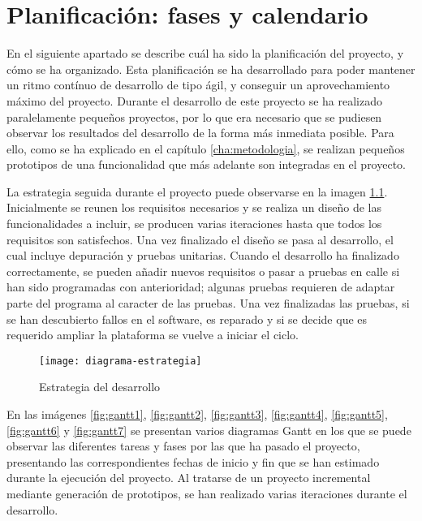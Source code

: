 \chapter{Planificación: fases y calendario}
En el siguiente apartado se describe cuál ha sido la planificación del proyecto, y cómo se ha organizado. Esta planificación se ha desarrollado para poder mantener un ritmo contínuo de desarrollo de tipo ágil, y conseguir un aprovechamiento máximo del proyecto. Durante el desarrollo de este proyecto se ha realizado paralelamente pequeños proyectos, por lo que era necesario que se pudiesen observar los resultados del desarrollo de la forma más inmediata posible. Para ello, como se ha explicado en el capítulo \ref{cha:metodologia}, se realizan pequeños prototipos de una funcionalidad que más adelante son integradas en el proyecto.

La estrategia seguida durante el proyecto puede observarse en la imagen \ref{fig:estrategia}. Inicialmente se reunen los requisitos necesarios y se realiza un diseño de las funcionalidades a incluir, se producen varias iteraciones hasta que todos los requisitos son satisfechos. Una vez finalizado el diseño se pasa al desarrollo, el cual incluye depuración y pruebas unitarias. Cuando el desarrollo ha finalizado correctamente, se pueden añadir nuevos requisitos o pasar a pruebas en calle si han sido programadas con anterioridad; algunas pruebas requieren de adaptar parte del programa al caracter de las pruebas. Una vez finalizadas las pruebas, si se han descubierto fallos en el software, es reparado y si se decide que es requerido ampliar la plataforma se vuelve a iniciar el ciclo.
\begin{figure}[H]
	\begin{center}
		\texttt{[image: diagrama-estrategia]}
		\caption{Estrategia del desarrollo}
		\label{fig:estrategia}
	\end{center}
\end{figure}

En las imágenes \ref{fig:gantt1}, \ref{fig:gantt2}, \ref{fig:gantt3}, \ref{fig:gantt4}, \ref{fig:gantt5}, \ref{fig:gantt6} y \ref{fig:gantt7} se presentan varios diagramas Gantt en los que se puede observar las diferentes tareas y fases por las que ha pasado el proyecto, presentando las correspondientes fechas de inicio y fin que se han estimado durante la ejecución del proyecto. Al tratarse de un proyecto incremental mediante generación de prototipos, se han realizado varias iteraciones durante el desarrollo.

